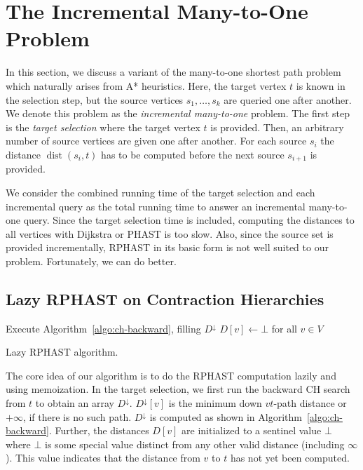 \documentclass[manuscript,review]{acmart}
\newcommand*{\dist}{\operatorname{dist}}
\newcommand*{\echu}{E^{\uparrow}}
\begin{document}
\section{The Incremental Many-to-One Problem}\label{sec:lazy-rphast}

In this section, we discuss a variant of the many-to-one shortest path problem which naturally arises from A* heuristics.
Here, the target vertex $t$ is known in the selection step, but the source vertices $s_1,\dots,s_k$ are queried one after another.
We denote this problem as the \emph{incremental many-to-one} problem.
The first step is the \emph{target selection} where the target vertex $t$ is provided.
Then, an arbitrary number of source vertices are given one after another.
For each source $s_i$ the distance $\dist(s_i, t)$ has to be computed before the next source $s_{i+1}$ is provided.

We consider the combined running time of the target selection and each incremental query as the total running time to answer an incremental many-to-one query.
Since the target selection time is included, computing the distances to all vertices with Dijkstra or PHAST is too slow.
Also, since the source set is provided incrementally, RPHAST in its basic form is not well suited to our problem.
Fortunately, we can do better.

\subsection{Lazy RPHAST on Contraction Hierarchies}

\begin{algorithm2e}[tb]

Execute Algorithm~\ref{algo:ch-backward}, filling $D^{\downarrow}$\;
$D[v] \gets \bot$ for all $v \in V$\;

\Fn{\Dist{$u$}}{
	\If{$D[u] = \bot$}{
		$D[u]\leftarrow D^{\downarrow}[u]$\;
		\For{all up-edges $uv \in \echu$}{
      $D[u]\leftarrow\min(D[u],w(uv)+\Dist(v))$\;
		}
	}
	\Return{$D[u]$}\;
}
\caption{Lazy RPHAST algorithm.}
\label{algo:lazy_rphast_ch}
\end{algorithm2e}

The core idea of our algorithm is to do the RPHAST computation lazily and using memoization.
In the target selection, we first run the backward CH search from $t$ to obtain an array $D^{\downarrow}$.
$D^{\downarrow}[v]$ is the minimum down $vt$-path distance or $+\infty$, if there is no such path.
$D^{\downarrow}$ is computed as shown in Algorithm~\ref{algo:ch-backward}.
Further, the distances $D[v]$ are initialized to a sentinel value $\bot$ where $\bot$ is some special value distinct from any other valid distance (including $\infty$).
This value indicates that the distance from $v$ to $t$ has not yet been computed.
\end{document}
